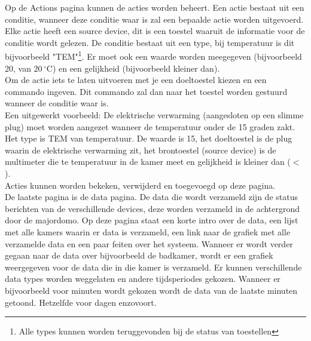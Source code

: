 \documentclass{article}
\begin{document}
Op de Actions pagina kunnen de acties worden beheert. Een actie bestaat uit een conditie, wanneer deze conditie waar is zal een bepaalde actie worden uitgevoerd. Elke actie heeft een source device, dit is een toestel waaruit de informatie voor de conditie wordt gelezen. De conditie bestaat uit een type, bij temperatuur is dit bijvoorbeeld "TEM"\footnote{Alle types kunnen worden teruggevonden bij de status van toestellen}. Er moet ook een waarde worden meegegeven (bijvoorbeeld 20, van $20\,^{\circ}\mathrm{C}$) en een gelijkheid (bijvoorbeeld kleiner dan).\\
Om de actie iets te laten uitvoeren met je een doeltoestel kiezen en een commando ingeven. Dit commando zal dan naar het toestel worden gestuurd wanneer de conditie waar is.\\
Een uitgewerkt voorbeeld: De elektrische verwarming (aangesloten op een slimme plug) moet worden aangezet wanneer de temperatuur onder de 15 graden zakt. Het type is TEM van temperatuur. De waarde is 15, het doeltoestel is de plug waarin de elektrische verwarming zit, het brontoestel (source device) is de multimeter die te temperatuur in de kamer meet en gelijkheid is kleiner dan ($<$).\\
Acties kunnen worden bekeken, verwijderd en toegevoegd op deze pagina.\\

De laatste pagina is de data pagina. De data die wordt verzameld zijn de status berichten van de verschillende devices, deze worden verzameld in de achtergrond door de majordomo. Op deze pagina staat een korte intro over de data, een lijst met alle kamers waarin er data is verzameld, een link naar de grafiek met alle verzamelde data en een paar feiten over het systeem. Wanneer er wordt verder gegaan naar de data over bijvoorbeeld de badkamer, wordt er een grafiek weergegeven voor de data die in die kamer is verzameld. Er kunnen verschillende data types worden weggelaten en andere tijdsperiodes gekozen. Wanneer er bijvoorbeeld voor minuten wordt gekozen wordt de data van de laatste minuten getoond. Hetzelfde voor dagen enzovoort.\\
\end{document}
